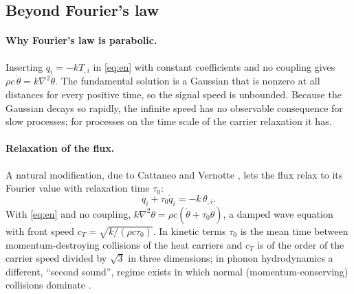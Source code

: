 \begin{table}[ht]\centering\small
\caption{Thermoelastic coupling $\varepsilon$ and characteristic frequency $f_*=\omega_*/2\pi$ computed from rounded handbook-type values (300\,K) of density, specific heat, conductivity, expansion coefficient, Young's modulus and Poisson ratio; the reader should replace them by data for the specimen at hand.}\label{tab:materials}

\end{table}

\subsection{Beyond Fourier's law}\label{sec:beyond}
\paragraph{Why Fourier's law is parabolic.} Inserting $q_i=-kT_{,i}$ in \eqref{eq:en} with constant coefficients and no coupling gives $\rho c\,\dot\theta=k\nabla^2\theta$. The fundamental solution is a Gaussian that is nonzero at all distances for every positive time, so the signal speed is unbounded. Because the Gaussian decays so rapidly, the infinite speed has no observable consequence for slow processes; for processes on the time scale of the carrier relaxation it has.

\paragraph{Relaxation of the flux.} A natural modification, due to Cattaneo and Vernotte \citep{Cattaneo1948,Vernotte1958}, lets the flux relax to its Fourier value with relaxation time $\tau_0$:
\begin{equation}
q_i+\tau_0\dot q_i=-k\,\theta_{,i}.\label{eq:cattaneo}
\end{equation}
With \eqref{eq:en} and no coupling, $k\nabla^2\theta=\rho c(\dot\theta+\tau_0\ddot\theta)$, a damped wave equation with front speed $c_T=\sqrt{k/(\rho c\tau_0)}$. In kinetic terms $\tau_0$ is the mean time between momentum-destroying collisions of the heat carriers and $c_T$ is of the order of the carrier speed divided by $\sqrt3$ in three dimensions; in phonon hydrodynamics a different, ``second sound'', regime exists in which normal (momentum-conserving) collisions dominate \citep{GuyerKrumhansl1966,GuyerKrumhansl1966II,Chester1963}.

